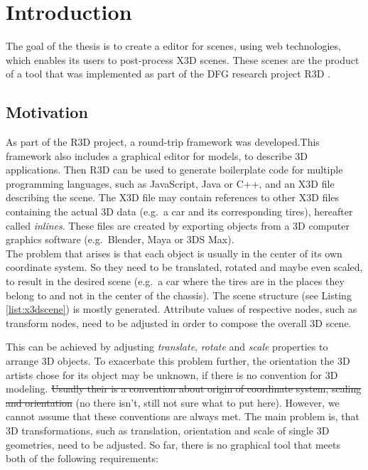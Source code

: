 
\section{Introduction}
\label{sec:Prelude}

The goal of the thesis is to create a editor for  scenes, using web technologies,
which enables its users to post-process \gls{X3D} scenes. These scenes are the
product of a tool that was implemented as part of the DFG research
project \gls{R3D} \cite{Jung:2015:SDA:2802768.2802837}.
\subsection{Motivation}\label{motivation}

As part of the \gls{R3D} project, a round-trip framework
 was developed.This framework also includes a
graphical editor for  \cite{Lenk:2012:MID:2338714.2338742} models, to describe \gls{3D} applications. Then
\gls{R3D} can be used to generate boilerplate code for multiple programming
languages, such as JavaScript, Java or C++, and an \gls{X3D} file describing
the scene. The \gls{X3D} file may contain references to other \gls{X3D} files
containing the actual \gls{3D} data (e.g.~a car and its corresponding tires),
hereafter called \emph{inlines}. These files are created by exporting
objects from a \gls{3D} computer graphics software (e.g.~Blender,
Maya or 3DS Max).\\
The problem that arises is that each object is usually in the center of
its own coordinate system. So they need to be translated, rotated and
maybe even scaled, to result in the desired scene (e.g.~a car where the tires
are in the places they belong to and not in the center of the chassis).
The scene structure (see Listing \ref{list:x3dscene}) is mostly generated. Attribute values of respective nodes,
such as transform nodes, need to be adjusted in order to compose the
overall \gls{3D} scene.


This can be achieved by adjusting \emph{translate}, \emph{rotate} and
\emph{scale} properties to arrange \gls{3D} objects. To exacerbate this problem
further, the orientation the \gls{3D} artists chose for its object may be unknown, if
there is no convention for \gls{3D} modeling. \sout{Usually their is a convention
about origin of coordinate system, scaling and orientation} (no there isn't, still
not sure what to put here). However, we cannot assume that these conventions are
always met. The main problem is, that \gls{3D} transformations, such as translation,
orientation and scale of single \gls{3D} geometries, need to be adjusted. So far,
there is no graphical tool that meets both of the following requirements:

